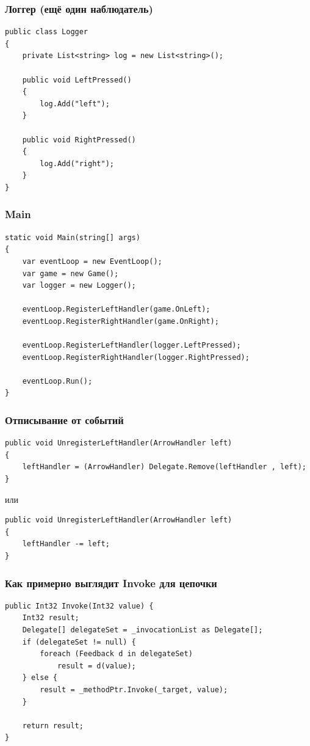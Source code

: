 \documentclass[xetex,mathserif,serif]{beamer}
\begin{document}
	\begin{frame}[fragile]
		\frametitle{Логгер (ещё один наблюдатель)}
		\begin{verbatim}
public class Logger
{
    private List<string> log = new List<string>();

    public void LeftPressed()
    {
        log.Add("left");
    }

    public void RightPressed()
    {
        log.Add("right");
    }
}
		\end{verbatim}
	\end{frame}

	\begin{frame}[fragile]
		\frametitle{Main}
		\begin{verbatim}
static void Main(string[] args)
{
    var eventLoop = new EventLoop();
    var game = new Game();
    var logger = new Logger();

    eventLoop.RegisterLeftHandler(game.OnLeft);
    eventLoop.RegisterRightHandler(game.OnRight);

    eventLoop.RegisterLeftHandler(logger.LeftPressed);
    eventLoop.RegisterRightHandler(logger.RightPressed);

    eventLoop.Run();
}
		\end{verbatim}
	\end{frame}

	\begin{frame}[fragile]
		\frametitle{Отписывание от событий}
		\begin{verbatim}
public void UnregisterLeftHandler(ArrowHandler left)
{
    leftHandler = (ArrowHandler) Delegate.Remove(leftHandler , left);
}
		\end{verbatim}
		\vspace{3mm}
		или
		\begin{verbatim}
public void UnregisterLeftHandler(ArrowHandler left)
{
    leftHandler -= left;
}
		\end{verbatim}
	\end{frame}

	\begin{frame}[fragile]
		\frametitle{Как примерно выглядит Invoke для цепочки}
		\begin{verbatim}
public Int32 Invoke(Int32 value) {
    Int32 result;
    Delegate[] delegateSet = _invocationList as Delegate[];
    if (delegateSet != null) {
        foreach (Feedback d in delegateSet)
            result = d(value);
    } else {
        result = _methodPtr.Invoke(_target, value);
    }

    return result;
}
		\end{verbatim}
	\end{frame}
\end{document}

